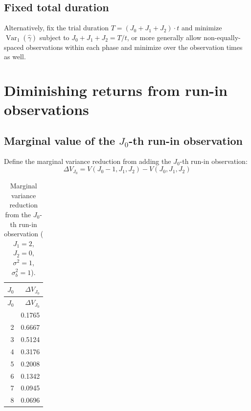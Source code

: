 \documentclass[
  11pt,
]{article}
\begin{document}
\subsection{Fixed total duration}\label{fixed-total-duration}

Alternatively, fix the trial duration \(T = (J_0 + J_1 + J_2) \cdot t\)
and minimize \(\mathop{\mathrm{Var}}_1(\hat\gamma)\) subject to
\(J_0 + J_1 + J_2 = T/t\), or more generally allow non-equally-spaced
observations within each phase and minimize over the observation times
as well.

\section{Diminishing returns from run-in
observations}\label{diminishing-returns-from-run-in-observations}

\subsection{\texorpdfstring{Marginal value of the \(J_0\)-th run-in
observation}{Marginal value of the J\_0-th run-in observation}}\label{marginal-value-of-the-j_0-th-run-in-observation}

Define the marginal variance reduction from adding the \(J_0\)-th run-in
observation: \begin{equation}
  \Delta V_{J_0} = V(J_0 - 1, J_1, J_2) - V(J_0, J_1, J_2)
\end{equation}

\begin{longtable}[]{@{}rr@{}}
\caption{Marginal variance reduction from the \(J_0\)-th run-in
observation (\(J_1=2\), \(J_2=0\), \(\sigma^2 = 1\),
\(\sigma_b^2 = 1\)).}\tabularnewline
\toprule\noalign{}
\(J_0\) & \(\Delta V_{J_0}\) \\
\midrule\noalign{}
\endfirsthead
\toprule\noalign{}
\(J_0\) & \(\Delta V_{J_0}\) \\
\midrule\noalign{}
\endhead
\bottomrule\noalign{}
\endlastfoot
1 & 0.1765 \\
2 & 0.6667 \\
3 & 0.5124 \\
4 & 0.3176 \\
5 & 0.2008 \\
6 & 0.1342 \\
7 & 0.0945 \\
8 & 0.0696 \\
\end{longtable}
\end{document}
